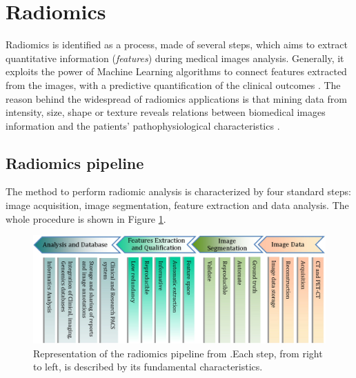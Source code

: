 \documentclass[../main.tex]{subfiles}
\begin{document}
\section{Radiomics}

Radiomics is identified as a process, made of several steps, which aims to extract quantitative information (\textit{features}) during medical images analysis. 
Generally, it exploits the power of Machine Learning algorithms to connect features extracted from the images, with a predictive quantification of the clinical outcomes \cite{kumar2012radiomics}.
The reason behind the widespread of radiomics applications is that
mining data from intensity, size, shape or texture reveals relations between biomedical images information and the patients' pathophysiological characteristics \cite{gillies2016radiomics-more-than-images}.


\subsection{Radiomics pipeline}\label{sec:radiomic-pipeline}

The method to perform radiomic analysis is characterized by four standard steps: image acquisition, image segmentation, feature extraction and data analysis. The whole procedure is shown in Figure \ref{fig:radiomics_pipeline}.

\begin{figure}[H] 
\begin{center}
\includegraphics[height=0.8\textwidth,angle=-90]{images/radiomics_pipeline.jpg}
\caption{\small{Representation of the radiomics pipeline from \cite{kumar2012radiomics}.Each step, from right to left, is described by its fundamental characteristics.}}\label{fig:radiomics_pipeline}
\end{center}
\end{figure}
\end{document}
